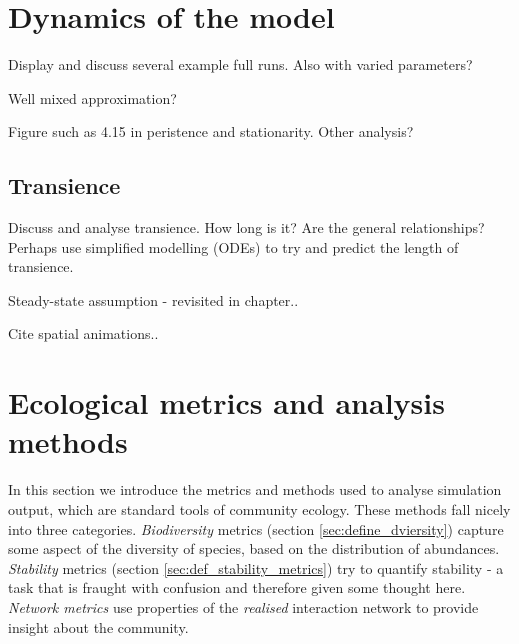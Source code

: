 \section{Dynamics of the model}
\label{sec:dynamics_results}

Display and discuss several example full runs. Also with varied parameters?

Well mixed approximation?

Figure such as 4.15 in peristence and stationarity. Other analysis?

\subsection{Transience}

Discuss and analyse transience. How long is it? Are the general relationships? Perhaps use simplified modelling (ODEs) to try and predict the length of transience.

Steady-state assumption - revisited in chapter..

Cite spatial animations..

\section{Ecological metrics and analysis methods}
\label{sec:metrics_explained}

In this section we introduce the metrics and methods used to analyse simulation output, which are standard tools of community ecology. These methods fall nicely into three categories. \emph{Biodiversity} metrics (section \ref{sec:define_dviersity}) capture some aspect of the diversity of species, based on the distribution of abundances. \emph{Stability} metrics (section \ref{sec:def_stability_metrics}) try to quantify stability - a task that is fraught with confusion and therefore given some thought here. \emph{Network metrics} use properties of the \emph{realised} interaction network to provide insight about the community.      



